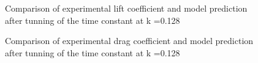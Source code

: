 \begin{figure}[h]
  \begin{center}
  \end{center}
  \caption{Comparison of experimental lift coefficient and model prediction after tunning of the time constant at k =0.128}
  \label{fig:Cl_u=3_meanaoa=12_amp=2_freq=0p5}
\end{figure}

\begin{figure}[h]
  \begin{center}
  \end{center}
  \caption{Comparison of experimental drag coefficient and model prediction after tunning of the time constant at k =0.128}
  \label{fig:Cd_u=3_meanaoa=12_amp=2_freq=0p5}
\end{figure}

